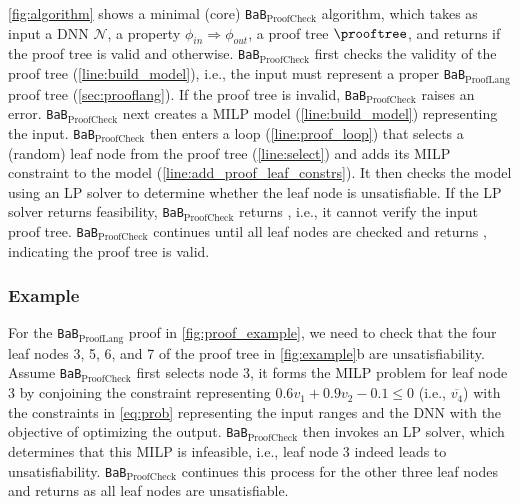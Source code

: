 \documentclass[oneside,11pt,dvipsnames]{book}
\newcommand{\prooflang}{\texttt{BaB$_{\text{ProofLang}}$}}
\newcommand{\proofcheck}{\texttt{BaB$_{\text{ProofCheck}}$}}
\newcommand{\mycomment}[3][\color{blue}]{{#1{{#2}: {#3}}}}
\newcommand{\tvn}[1]{\mycomment{TVN}{#1}}{}
\begin{document}
\autoref{fig:algorithm} shows a minimal (core)  \proofcheck{} algorithm, which takes as input a DNN $\mathcal{N}$, a property $\phi_{in} \Rightarrow \phi_{out}$, a proof tree $\prooftree$, and returns \certified if the proof tree is valid and \uncertified otherwise. 
\proofcheck{} first checks the validity of the proof tree (\autoref{line:build_model}), i.e., the input must represent a proper \prooflang{} proof tree (\autoref{sec:prooflang}).  
If the proof tree is invalid, \proofcheck{} raises an error.
\proofcheck{} next creates a MILP model (\autoref{line:build_model}) representing the input. %
\proofcheck{} then enters a loop (\autoref{line:proof_loop}) that selects a (random) leaf node from the proof tree (\autoref{line:select}) and adds its MILP constraint to the model (\autoref{line:add_proof_leaf_constrs}). It then checks the model using an LP solver to determine whether the leaf node is unsatisfiable. If the LP solver returns feasibility, \proofcheck{} returns \uncertified, i.e., it cannot verify the input proof tree. 
\proofcheck{} continues until all leaf nodes are checked and returns \certified, indicating the proof tree is valid.



\subsubsection{Example} For the \prooflang{} proof in \autoref{fig:proof_example}, we need to check that the four leaf nodes 3, 5, 6, and 7 of the proof tree in \autoref{fig:example}b are unsatisfiability. Assume \proofcheck{} first selects node 3, it forms the MILP problem for leaf node 3 by conjoining the constraint representing $0.6v_1 + 0.9v_2 - 0.1 \le 0$ (i.e., $\overline{v_4}$) %
with the constraints in \autoref{eq:prob} representing the input ranges and the DNN with the objective of optimizing the output. \proofcheck{} then invokes an LP solver, which determines that this MILP is infeasible, i.e., leaf node 3 indeed leads to unsatisfiability. \proofcheck{} continues this process for the other three leaf nodes and returns \certified as all leaf nodes are unsatisfiable.
\end{document}
